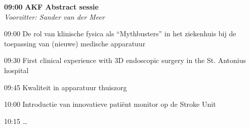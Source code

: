 \documentclass[a4paper,10pt]{report}
\begin{document}
\begin{multicols*}{3}
\begin{packed_enum}
\item[\textbf{09:00}] \textbf{AKF Abstract sessie}\\\textit{Voorzitter: Sander van der Meer}
\item[09:00] De rol van klinische fysica als ``Mythbusters'' in het zieken\-huis bij de toe\-passing van (nieuwe) medische appara\-tuur
\item[09:30] First clinical experience with 3D endoscopic surgery in the St. Antonius hospital
\item[09:45] Kwaliteit in apparatuur thuiszorg
\item[10:00] Introductie van innovatieve patiënt monitor op de Stroke Unit
\item[10:15] \ldots\itemauthor{\ldots}
\end{packed_enum} %

\end{multicols*}
\end{document}
